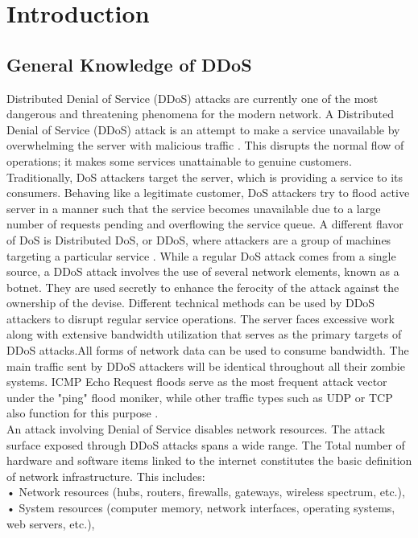 \chapter{Introduction}
\section{General Knowledge of DDoS}
Distributed Denial of Service (DDoS) attacks are currently one of the most dangerous and threatening phenomena for the modern network. A Distributed Denial of Service (DDoS) attack is an attempt to make a service unavailable by overwhelming the server with malicious traffic \cite{8394146}. This disrupts the normal flow of operations; it makes some services unattainable to genuine customers. Traditionally, DoS attackers target the server, which is providing a service to its consumers. Behaving like a legitimate customer, DoS attackers try to flood active server in a manner such that the service becomes unavailable due to a large number of requests pending and overflowing the service queue. A different flavor of DoS is Distributed DoS, or DDoS, where attackers are a group of machines targeting a particular service \cite{somani2017ddos}. While a regular DoS attack comes from a single source, a DDoS attack involves the use of several network elements, known as a botnet. They are used secretly to enhance the ferocity of the attack against the ownership of the devise. Different technical methods can be used by DDoS attackers to disrupt regular service operations. The server faces excessive work along with extensive bandwidth utilization that serves as the primary targets of DDoS attacks.All forms of network data can be used to consume bandwidth. The main traffic sent by DDoS attackers will be identical throughout all their zombie systems. ICMP Echo Request floods serve as the most frequent attack vector under the "ping" flood moniker, while other traffic types such as UDP or TCP also function for this purpose \cite{NAZARIO20087}. \\
An attack involving Denial of Service disables network resources. The attack surface exposed through DDoS attacks spans a wide range. The Total number of hardware and software items linked to the internet constitutes the basic definition of network infrastructure. This includes:
\\
• Network resources (hubs, routers, firewalls, gateways, wireless spectrum, etc.),\\
• System resources (computer memory, network interfaces, operating systems, web servers, etc.),\\
